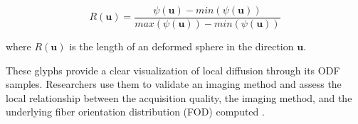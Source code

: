\documentclass[twoside,twocolumn,10pt]{article}
\begin{document}


\begin{equation}
\label{eq::normglifo}
    R(\bm{u}) = \frac{\psi(\bm{u}) - min(\psi(\bm{u}))}{max(\psi(\bm{u})) - min(\psi(\bm{u}))}
\end{equation}

where $R(\bm{u})$ is the length of an deformed sphere in the direction $\bm{u}$.

These glyphs provide a clear visualization of local diffusion through its ODF samples. Researchers use them to validate an imaging method \cite{descoteaux2007_QBI,  TuchQBall2004,tournier2007,Tournier2004DirectEO, tuch2002,  yeh2010} and assess the local relationship between the acquisition quality, the imaging method, and the underlying fiber orientation distribution (FOD) computed \cite{cho2008, daducci2014,descoteaux2007,  vega2009}. %
\end{document}
